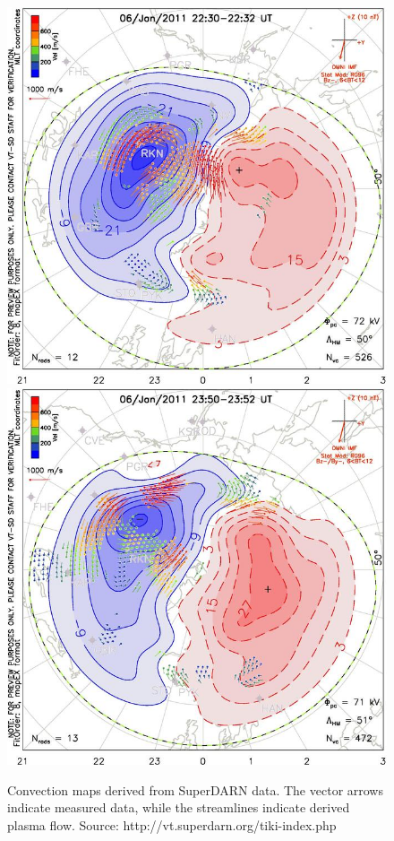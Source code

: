 \documentclass[norsk,a4paper,12pt]{article}
\begin{document}
\begin{figure}[H]
\includegraphics[scale = 1.1]{Figures/Superdarn/superdarn_22_32.jpg}
\includegraphics[scale = 1.1]{Figures/Superdarn/superdarn_23_52.jpg}
\centering
\caption{Convection maps derived from SuperDARN data. The vector arrows indicate measured data, while the streamlines indicate derived plasma flow. Source: http://vt.superdarn.org/tiki-index.php}
\label{fig::superdarn_data}
\end{figure}
\end{document}
